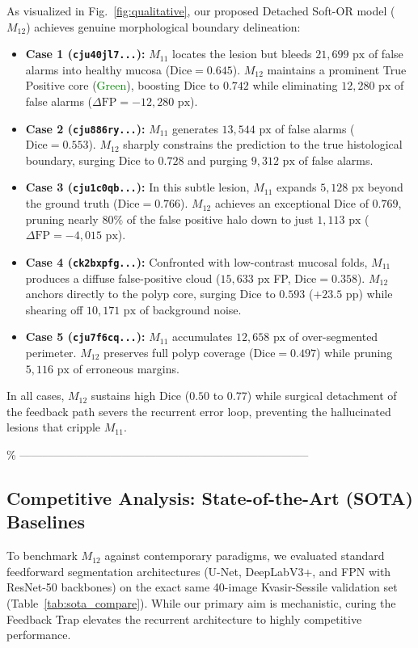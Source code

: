 As visualized in Fig.~\ref{fig:qualitative}, our proposed Detached
Soft-OR model ($M_{12}$) achieves genuine morphological boundary
delineation:
\begin{itemize}
  \item \textbf{Case 1 (\texttt{cju40jl7...}):}
        $M_{11}$ locates the lesion but bleeds $21{,}699\text{ px}$
        of false alarms into healthy mucosa ($\text{Dice} = 0.645$).
        $M_{12}$ maintains a prominent True Positive core
        (\textcolor{green}{Green}), boosting Dice to \textbf{$0.742$}
        while eliminating \textbf{$12{,}280\text{ px}$} of false alarms
        ($\Delta\text{FP} = -12{,}280\text{ px}$).
  \item \textbf{Case 2 (\texttt{cju886ry...}):}
        $M_{11}$ generates $13{,}544\text{ px}$ of false alarms
        ($\text{Dice} = 0.553$). $M_{12}$ sharply constrains the
        prediction to the true histological boundary, surging Dice to
        \textbf{$0.728$} and purging $9{,}312\text{ px}$ of false alarms.
  \item \textbf{Case 3 (\texttt{cju1c0qb...}):}
        In this subtle lesion, $M_{11}$ expands $5{,}128\text{ px}$
        beyond the ground truth ($\text{Dice} = 0.766$). $M_{12}$
        achieves an exceptional Dice of \textbf{$0.769$}, pruning
        nearly $80\%$ of the false positive halo down to just
        $1{,}113\text{ px}$ ($\Delta\text{FP} = -4{,}015\text{ px}$).
  \item \textbf{Case 4 (\texttt{ck2bxpfg...}):}
        Confronted with low-contrast mucosal folds, $M_{11}$ produces
        a diffuse false-positive cloud ($15{,}633\text{ px}$ FP,
        $\text{Dice} = 0.358$). $M_{12}$ anchors directly to the polyp
        core, surging Dice to \textbf{$0.593$} ($+23.5$ pp) while
        shearing off $10{,}171\text{ px}$ of background noise.
  \item \textbf{Case 5 (\texttt{cju7f6cq...}):}
        $M_{11}$ accumulates $12{,}658\text{ px}$ of over-segmented
        perimeter. $M_{12}$ preserves full polyp coverage
        ($\text{Dice} = 0.497$) while pruning $5{,}116\text{ px}$ of
        erroneous margins.
\end{itemize}
In all cases, $M_{12}$ sustains high Dice ($0.50$ to $0.77$) while
surgical detachment of the feedback path severs the recurrent error
loop, preventing the hallucinated lesions that cripple $M_{11}$.

\% -----------------------------------------------------------------------------
\subsection{Competitive Analysis: State-of-the-Art (SOTA) Baselines}
To benchmark $M_{12}$ against contemporary paradigms, we evaluated
standard feedforward segmentation architectures (U-Net, DeepLabV3+, and FPN
with ResNet-50 backbones) on the exact same 40-image Kvasir-Sessile
validation set (Table~\ref{tab:sota_compare}). While our primary aim is mechanistic,
curing the Feedback Trap elevates the recurrent architecture to highly
competitive performance.

